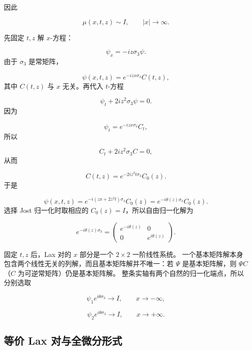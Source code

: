 \documentclass[
    lang=cn,
    scheme=chinese,
    mode=simple,
    device=normal,
    color=blue,
    math=cm,
    thmcnt=section,
    12pt,
    nowatermark
]{elegantbook}
\begin{document}
因此

\begin{equation}
    \mu(x,t,z)\sim I,\qquad \lvert x\rvert\to\infty.
    \tag{5.1.6}
    \label{eq:5.1.6}
\end{equation}

\begin{callout}[计算：这个自由基本解是怎样求出来的？]
    先固定 $t,z$ 解 $x$-方程：

    \[
        \psi_x=-iz\sigma_3\psi.
    \]
    由于 $\sigma_3$ 是常矩阵，

    \[
        \psi(x,t,z)
        =
        e^{-izx\sigma_3}C(t,z),
    \]
    其中 $C(t,z)$ 与 $x$ 无关。再代入 $t$-方程

    \[
        \psi_t+2iz^2\sigma_3\psi=0.
    \]
    因为

    \[
        \psi_t=e^{-izx\sigma_3}C_t,
    \]
    所以

    \[
        C_t+2iz^2\sigma_3C=0,
    \]
    从而

    \[
        C(t,z)
        =
        e^{-2iz^2t\sigma_3}C_0(z).
    \]
    于是

    \[
        \psi(x,t,z)
        =
        e^{-i(zx+2z^2t)\sigma_3}C_0(z)
        =
        e^{-i\theta(z)\sigma_3}C_0(z).
    \]
    选择 Jost 归一化时取相应的 $C_0(z)=I$，所以自由归一化解为

    \[
        e^{-i\theta(z)\sigma_3}
        =
        \begin{pmatrix}
            e^{-i\theta(z)} & 0              \\
            0               & e^{i\theta(z)}
        \end{pmatrix}.
    \]

\end{callout}

\begin{callout}
    固定 $t,z$ 后，Lax 对的 $x$ 部分是一个 $2\times2$ 一阶线性系统。
    一个基本矩阵解本身包含两个线性无关的列解，而且基本矩阵解并不唯一：若 $\Psi$ 是基本矩阵解，则 $\Psi C$（$C$ 为可逆常矩阵）仍是基本矩阵解。
    整条实轴有两个自然的归一化端点，所以分别选取

    \[
        \psi_1e^{i\theta\sigma_3}\to I,\qquad x\to-\infty,
    \]

    \[
        \psi_2e^{i\theta\sigma_3}\to I,\qquad x\to+\infty.
    \]
\end{callout}

\subsection{等价 Lax 对与全微分形式}
\end{document}

